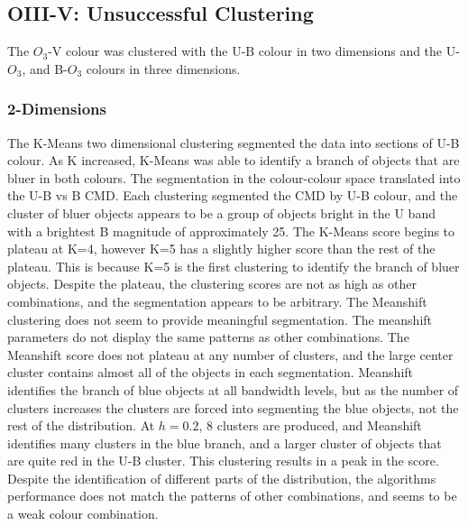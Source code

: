 \subsection{OIII-V: Unsuccessful Clustering}
The $O_{3}$-V colour was clustered with the U-B colour in two dimensions and the U-$O_{3}$, and B-$O_{3}$ colours in three dimensions.

\subsubsection{2-Dimensions}
The K-Means two dimensional clustering segmented the data into sections of U-B colour.
As K increased, K-Means was able to identify a branch of objects that are bluer in both colours.
The segmentation in the colour-colour space translated into the U-B vs B CMD. 
Each clustering segmented the CMD by U-B colour, and the cluster of bluer objects appears to be a group of objects bright in the U band with a brightest B magnitude of approximately 25.
The K-Means score begins to plateau at K=4, however K=5 has a slightly higher score than the rest of the plateau. This is because K=5 is the first clustering to identify the branch of bluer objects.
Despite the plateau, the clustering scores are not as high as other combinations, and the segmentation appears to be arbitrary. 
The Meanshift clustering does not seem to provide meaningful segmentation. The meanshift parameters do not display the same patterns as other combinations. 
The Meanshift score does not plateau at any number of clusters, and the large center cluster contains almost all of the objects in each segmentation.
Meanshift identifies the branch of blue objects at all bandwidth levels, but as the number of clusters increases the clusters are forced into segmenting the blue objects, not the rest of the distribution.
At $h=0.2$, 8 clusters are produced, and Meanshift identifies many clusters in the blue branch, and a larger cluster of objects that are quite red in the U-B cluster.
This clustering results in a peak in the score.
Despite the identification of different parts of the distribution, the algorithms performance does not match the patterns of other combinations, and seems to be a weak colour combination. 

